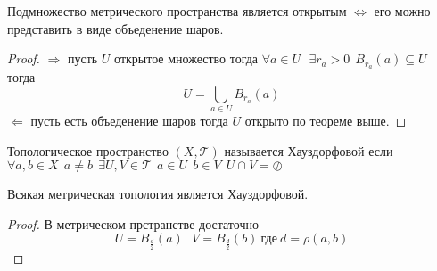 \begin{theorem}
  Подмножество метрического пространства является открытым $\Leftrightarrow$
  его можно представить в виде объеденение шаров.
\end{theorem}

\begin{proof}
  $\Rightarrow$ пусть $U$ открытое множество тогда $\forall a \in U ~~~
  \exists r_a > 0 ~~ B_{r_a}(a) \subseteq U$ тогда
  $$
  U = \bigcup_{a \in U} B_{r_a}(a)
  $$
  $\Leftarrow$ пусть есть объеденение шаров тогда $U$ открыто по теореме выше.
\end{proof}

\begin{define}
  Топологическое пространство $(X, \mathcal{T})$ называется Хауздорфовой если
  $\forall a,b \in X ~~ a \not= b ~~ \exists U, V \in \mathcal{T} ~~
  a \in U ~~ b \in V ~~ U \cap V = \oslash$
\end{define}

\begin{theorem}
  Всякая метрическая топология является Хауздорфовой.
\end{theorem}

\begin{proof}
  В метрическом прстранстве достаточно
  $$
  U = B_{\frac{d}{2}}(a) ~~~ V = B_{\frac{d}{2}}(b) ~ \text{где} ~ d = \rho(a,b)
  $$
\end{proof}
